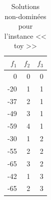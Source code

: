 \documentclass[12pt, a4paper, french, version=last, parskip=half, titlepage]{scrartcl}
\begin{document}
\begin{table}[H]
    \centering
    \begin{tabular}{r r r}
        \toprule
        $f_1$ & $f_2$ & $f_3$ \\
        \midrule
          0 & 0 & 0 \\
        -20 & 1 & 1 \\
        -37 & 2 & 1 \\
        -49 & 3 & 1 \\
        -59 & 4 & 1 \\
        -30 & 1 & 2 \\
        -55 & 2 & 2 \\
        -65 & 3 & 2 \\
        -42 & 1 & 3 \\
        -65 & 2 & 3 \\
        \bottomrule
    \end{tabular}
    \caption{Solutions non-dominées pour l'instance << toy >>}
\end{table}
\end{document}
